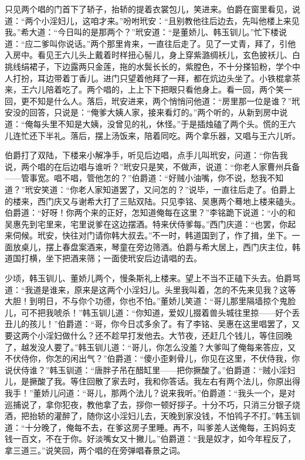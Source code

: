 只见两个唱的门首下了轿子，抬轿的提着衣裳包儿，笑进来。伯爵在窗里看见，说道：“两个小淫妇儿，这咱才来。”吩咐玳安：“且别教他往后边去，先叫他楼上来见我。”希大道：“今日叫的是那两个？”玳安道：“是董娇儿、韩玉钏儿。”忙下楼说道：“应二爹叫你说话。”两个那里肯来，一直往后走了。见了一丈青，拜了，引他入房中。看见王六儿头上戴着时样扭心髻儿，身上穿紫潞绸袄儿，玄色披袄儿、白挑线绢裙子，下边露两只金莲，拖的水鬓长长的，紫膛色，不十分搽铅粉，学个中人打扮，耳边带着丁香儿。进门只望着他拜了一拜，都在炕边头坐了。小铁棍拿茶来，王六儿陪着吃了。两个唱的，上上下下把眼只看他身上。看一回，两个笑一回，更不知是什么人。落后，玳安进来，两个悄悄问他道：“房里那一位是谁？”玳安没的回答，只说是：“俺爹大姨人家，接来看灯的。”两个听的，从新到房中说道：“俺每头里不知是大姨，没曾见的礼，休怪。”于是插烛磕了两个头。慌的王六儿连忙还下半礼。落后，摆上汤饭来，陪着同吃。两个拿乐器，又唱与王六儿听。

伯爵打了双陆，下楼来小解净手，听见后边唱，点手儿叫玳安，问道：“你告我说，两个唱的在后边唱与谁听？”玳安只是笑，不做声，说道：“你老人家曹州兵备——管事宽。唱不唱，管他怎的？”伯爵道：“好贼小油嘴，你不说，愁我不知道？”玳安笑道：“你老人家知道罢了，又问怎的？”说毕，一直往后走了。伯爵上的楼来，西门庆又与谢希大打了三贴双陆。只见李铭、吴惠两个蓦地上楼来磕头。伯爵道：“好呀！你两个来的正好，怎知道俺每在这里？”李铭跪下说道：“小的和吴惠先到宅里来，宅里说爹在这边摆酒。特来伏侍爹每。”西门庆道：“也罢，你起来伺候。玳安，快往对门请你韩大叔去。”不一时，韩道国到了，作了揖，坐下。一面放桌儿，摆上春盘案酒来，琴童在旁边筛酒。伯爵与希大居上，西门庆主位，韩道国打横，坐下把酒来筛；一面使玳安后边请唱的去。

少顷，韩玉钏儿、董娇儿两个，慢条斯礼上楼来。望上不当不正磕下头去。伯爵骂道：“我道是谁来，原来是这两个小淫妇儿。头里我叫着，怎的不先来见我？这等大胆！到明日，不与你个功德，你也不怕。”董娇儿笑道：“哥儿那里隔墙掠个鬼脸儿，可不把我唬杀！”韩玉钏儿道：“你知道，爱奴儿掇着兽头城往里掠——好个丢丑儿的孩儿！”伯爵道：“哥，你今日忒多余了。有了李铭、吴惠在这里唱罢了，又要这两个小淫妇做什么？还不趁早打发他去。大节夜，还赶几个钱儿，等住回晚了，越发没人要了。”韩玉钏儿道：“哥儿，你怎么没羞？大爹叫了俺每来答应，又不伏侍你，你怎的闲出气？”伯爵道：“傻小歪剌骨儿，你见在这里，不伏侍我，你说伏侍谁？”韩玉钏道：“唐胖子吊在醋缸里——把你撅酸了。”伯爵道：“贼小淫妇儿，是撅酸了我。等住回散了家去时，我和你答话。我左右有两个法儿，你原出得我手！”董娇儿问道：“哥儿，那两个法儿？说来我听。”伯爵道：“我头一个，是对巡捕说了，拿你犯夜，教他拿了去，拶你一顿好拶子。十分不巧，只消三分银子烧酒，把抬轿的灌醉了，随你这小淫妇儿去，天晚到家没钱，不怕鸨子不打。”韩玉钏道：“十分晚了，俺每不去，在爹这房子里睡。再不，叫爹差人送俺每，王妈妈支钱一百文，不在于你。好淡嘴女又十撇儿。”伯爵道：“我是奴才，如今年程反了，拿三道三。”说笑回，两个唱的在旁弹唱春景之词。

